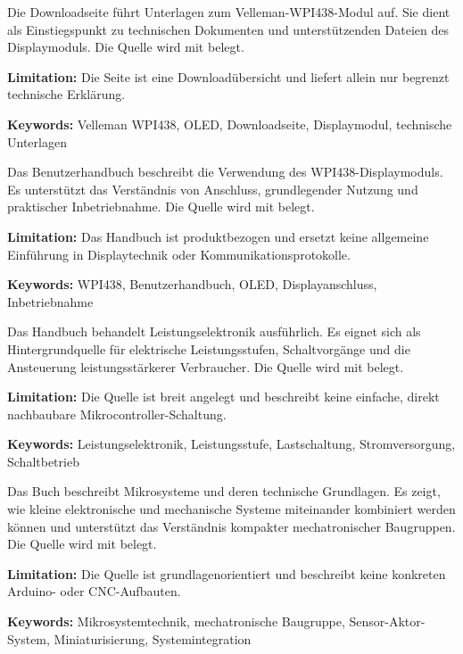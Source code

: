 
{ 
	Die Downloadseite führt Unterlagen zum Velleman-WPI438-Modul auf. Sie dient als Einstiegspunkt zu technischen Dokumenten und unterstützenden Dateien des Displaymoduls. Die Quelle wird mit \cite{Velleman:WPI438} belegt.
	
	\bigskip
	
	\textbf{Limitation:} Die Seite ist eine Downloadübersicht und liefert allein nur begrenzt technische Erklärung.
	
	\scriptsize{\textbf{Keywords:} Velleman WPI438, OLED, Downloadseite, Displaymodul, technische Unterlagen}
}



{ 
	Das Benutzerhandbuch beschreibt die Verwendung des WPI438-Displaymoduls. Es unterstützt das Verständnis von Anschluss, grundlegender Nutzung und praktischer Inbetriebnahme. Die Quelle wird mit \cite{Velleman:WPI438UserManual} belegt.
	
	\bigskip
	
	\textbf{Limitation:} Das Handbuch ist produktbezogen und ersetzt keine allgemeine Einführung in Displaytechnik oder Kommunikationsprotokolle.
	
	\scriptsize{\textbf{Keywords:} WPI438, Benutzerhandbuch, OLED, Displayanschluss, Inbetriebnahme}
}



{ 
	Das Handbuch behandelt Leistungselektronik ausführlich. Es eignet sich als Hintergrundquelle für elektrische Leistungsstufen, Schaltvorgänge und die Ansteuerung leistungsstärkerer Verbraucher. Die Quelle wird mit \cite{Zach:2022} belegt.
	
	\bigskip
	
	\textbf{Limitation:} Die Quelle ist breit angelegt und beschreibt keine einfache, direkt nachbaubare Mikrocontroller-Schaltung.
	
	\scriptsize{\textbf{Keywords:} Leistungselektronik, Leistungsstufe, Lastschaltung, Stromversorgung, Schaltbetrieb}
}



{ 
	Das Buch beschreibt Mikrosysteme und deren technische Grundlagen. Es zeigt, wie kleine elektronische und mechanische Systeme miteinander kombiniert werden können und unterstützt das Verständnis kompakter mechatronischer Baugruppen. Die Quelle wird mit \cite{zielke:2025} belegt.
	
	\bigskip
	
	\textbf{Limitation:} Die Quelle ist grundlagenorientiert und beschreibt keine konkreten Arduino- oder CNC-Aufbauten.
	
	\scriptsize{\textbf{Keywords:} Mikrosystemtechnik, mechatronische Baugruppe, Sensor-Aktor-System, Miniaturisierung, Systemintegration}
}
